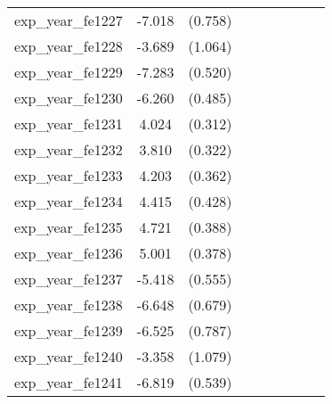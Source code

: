 {\begin{tabular}{l*{4}{cc}}
exp\_year\_fe1227&   -7.018\sym{***}&  (0.758)&                  &         &                  &         &                  &         \\
exp\_year\_fe1228&   -3.689\sym{***}&  (1.064)&                  &         &                  &         &                  &         \\
exp\_year\_fe1229&   -7.283\sym{***}&  (0.520)&                  &         &                  &         &                  &         \\
exp\_year\_fe1230&   -6.260\sym{***}&  (0.485)&                  &         &                  &         &                  &         \\
exp\_year\_fe1231&    4.024\sym{***}&  (0.312)&                  &         &                  &         &                  &         \\
exp\_year\_fe1232&    3.810\sym{***}&  (0.322)&                  &         &                  &         &                  &         \\
exp\_year\_fe1233&    4.203\sym{***}&  (0.362)&                  &         &                  &         &                  &         \\
exp\_year\_fe1234&    4.415\sym{***}&  (0.428)&                  &         &                  &         &                  &         \\
exp\_year\_fe1235&    4.721\sym{***}&  (0.388)&                  &         &                  &         &                  &         \\
exp\_year\_fe1236&    5.001\sym{***}&  (0.378)&                  &         &                  &         &                  &         \\
exp\_year\_fe1237&   -5.418\sym{***}&  (0.555)&                  &         &                  &         &                  &         \\
exp\_year\_fe1238&   -6.648\sym{***}&  (0.679)&                  &         &                  &         &                  &         \\
exp\_year\_fe1239&   -6.525\sym{***}&  (0.787)&                  &         &                  &         &                  &         \\
exp\_year\_fe1240&   -3.358\sym{**} &  (1.079)&                  &         &                  &         &                  &         \\
exp\_year\_fe1241&   -6.819\sym{***}&  (0.539)&                  &         &                  &         &                  &         \\

\end{tabular}}
